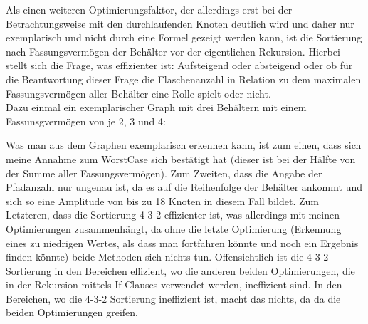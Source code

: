 \documentclass[10pt,a4paper]{scrartcl}
\begin{document}
Als einen weiteren Optimierungsfaktor, der allerdings erst bei der Betrachtungsweise mit den durchlaufenden Knoten deutlich wird und daher nur exemplarisch und nicht durch eine Formel gezeigt werden kann, ist die Sortierung nach Fassungsvermögen der Behälter vor der eigentlichen Rekursion. Hierbei stellt sich die Frage, was effizienter ist: Aufsteigend oder absteigend oder ob für die Beantwortung dieser Frage die Flaschenanzahl in Relation zu dem maximalen Fassungsvermögen aller Behälter eine Rolle spielt oder nicht. \\
Dazu einmal ein exemplarischer Graph mit drei Behältern mit einem Fassunsgvermögen von je 2, 3 und 4:
\begin{center}
	\label{fig:Sortierung}
\end{center}
Was man aus dem Graphen exemplarisch erkennen kann, ist zum einen, dass sich meine Annahme zum WorstCase sich bestätigt hat (dieser ist bei der Hälfte von der Summe aller Fassungsvermögen). Zum Zweiten, dass die Angabe der Pfadanzahl nur ungenau ist, da es auf die Reihenfolge der Behälter ankommt und sich so eine Amplitude von bis zu 18 Knoten in diesem Fall bildet. Zum Letzteren, dass die Sortierung 4-3-2 effizienter ist, was allerdings mit meinen Optimierungen zusammenhängt, da ohne die letzte Optimierung (Erkennung eines zu niedrigen Wertes, als dass man fortfahren könnte und noch ein Ergebnis finden könnte) beide Methoden sich nichts tun. Offensichtlich ist die 4-3-2 Sortierung in den Bereichen effizient, wo die anderen beiden Optimierungen, die in der Rekursion mittels If-Clauses verwendet werden, ineffizient sind. In den Bereichen, wo die 4-3-2 Sortierung ineffizient ist, macht das nichts, da da die beiden Optimierungen greifen.
\end{document}
